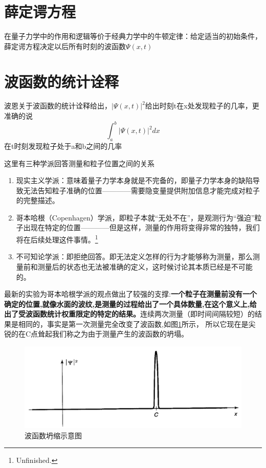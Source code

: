 	\section{薛定谔方程}
		在量子力学中的作用和逻辑等价于经典力学中的牛顿定律：给定适当的初始条件，薛定谔方程决定以后所有时刻的波函数$\Psi (x,t)$
	\section{波函数的统计诠释}
		波恩关于波函数的统计诠释给出，$|\Psi (x,t)|^2$给出时刻t在x处发现粒子的几率，更准确的说
		\begin{equation}
			\int_{a}^{b}|\Psi(x, t)|^{2} d x
		\end{equation}
		在t时刻发现粒子处于a和b之间的几率

		这里有三种学派回答测量和粒子位置之间的关系
		\begin{enumerate}
		\item 现实主义学派：意味着量子力学本身就是不完备的，即量子力学本身的缺陷导致无法告知粒子准确的位置————需要隐变量提供附加信息才能完成对粒子的完整描述。
		\item 哥本哈根（Copenhagen）学派，即粒子本就“无处不在”，是观测行为“强迫”粒子出现在特定的位置————但是这样，测量的作用将变得非常的独特，我们将在后续处理这件事情。\footnote{Unfinished.}
		\item 不可知论学派：即拒绝回答。即无法定义怎样的行为才能够称为测量，那么测量前和测量后的状态也无法被准确的定义，这时候讨论其本质已经是不可能的。
		\end{enumerate}
		
		最新的实验为哥本哈根学派的观点做出了较强的支撑:\textbf{一个粒子在测量前没有一个确定的位置,就像水面的波纹,是测量的过程给出了一个具体数量,在这个意义上,给出了受波函数统计权重限定的特定的结果。}连续两次测量（即时间间隔较短）的结果是相同的，事实是第一次测量完全改变了波函数,如图\ref{fig.WavefunctionCollapse}所示， 所以它现在是尖锐的在C点耸起我们称之为由于测量产生的波函数的坍塌。
		\begin{figure}[H]
			\centering
			\includegraphics[width=0.5\linewidth]{sections/fig/WavefunctionCollapse.png}
			\caption{波函数坍缩示意图} 
			\label{fig.WavefunctionCollapse}
		\end{figure}
